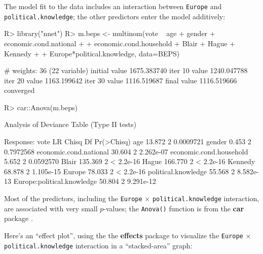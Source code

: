 \documentclass[
]{jss}
\begin{document}
The model fit to the data includes an interaction between
\texttt{Europe} and \texttt{political.knowledge}; the other predictors
enter the model additively:

\begin{CodeChunk}
\begin{CodeInput}
R> library("nnet")
R> m.beps <- multinom(vote ~ age + gender + economic.cond.national +
+                        economic.cond.household + Blair + Hague + Kennedy +
+                        Europe*political.knowledge, data=BEPS)
\end{CodeInput}
\begin{CodeOutput}
# weights:  36 (22 variable)
initial  value 1675.383740 
iter  10 value 1240.047788
iter  20 value 1163.199642
iter  30 value 1116.519687
final  value 1116.519666 
converged
\end{CodeOutput}
\begin{CodeInput}
R> car::Anova(m.beps)
\end{CodeInput}
\begin{CodeOutput}
Analysis of Deviance Table (Type II tests)

Response: vote
                           LR Chisq Df Pr(>Chisq)
age                          13.872  2  0.0009721
gender                        0.453  2  0.7972568
economic.cond.national       30.604  2  2.262e-07
economic.cond.household       5.652  2  0.0592570
Blair                       135.369  2  < 2.2e-16
Hague                       166.770  2  < 2.2e-16
Kennedy                      68.878  2  1.105e-15
Europe                       78.033  2  < 2.2e-16
political.knowledge          55.568  2  8.582e-13
Europe:political.knowledge   50.804  2  9.291e-12
\end{CodeOutput}
\end{CodeChunk}

Most of the predictors, including the \texttt{Europe} \(\times\)
\texttt{political.knowledge} interaction, are associated with very small
\(p\)-values; the \texttt{Anova()} function is from the \textbf{car}
package \citep{FoxWeisberg:2019}.

Here's an ``effect plot'', using the the \textbf{effects} package
\citep{FoxWeisberg:2019} to visualize the \texttt{Europe} \(\times\)
\texttt{political.knowledge} interaction in a ``stacked-area'' graph:
\end{document}
